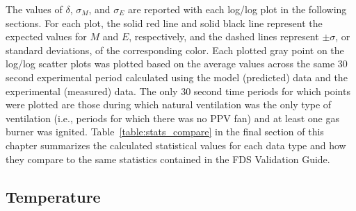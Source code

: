 The values of $\delta$, $\sigma_M$, and $\sigma_E$ are reported with each log/log plot in the following sections. For each plot, the solid red line and solid black line represent the expected values for $M$ and $E$, respectively, and the dashed lines represent $\pm \sigma$, or standard deviations, of the corresponding color. Each plotted gray point on the log/log scatter plots was plotted based on the average values across the same 30 second experimental period calculated using the model (predicted) data and the experimental (measured) data. The only 30 second time periods for which points were plotted are those during which natural ventilation was the only type of ventilation (i.e., periods for which there was no PPV fan) and at least one gas burner was ignited. Table~\ref{table:stats_compare} in the final section of this chapter summarizes the calculated statistical values for each data type and how they compare to the same statistics contained in the FDS Validation Guide.

\subsection{Temperature}

